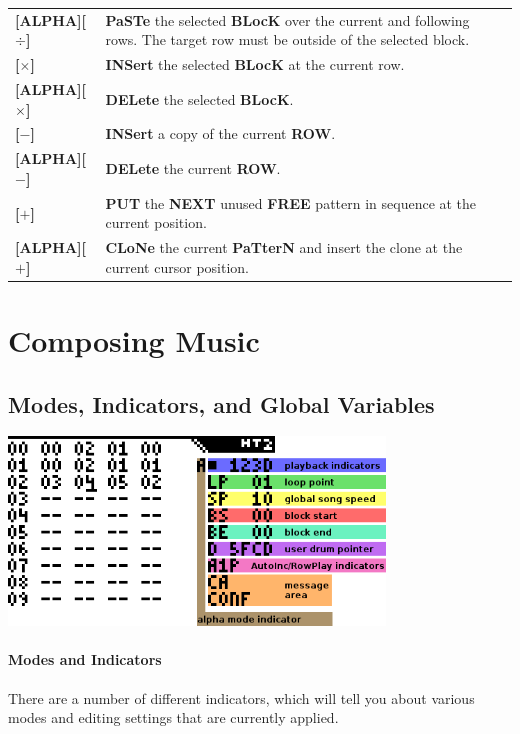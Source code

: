 \documentclass[12pt]{report}	%
\begin{document}
\begin{longtable}{p{} p{} }
\hline
\textbf{[ALPHA][\(\bm{\div}\)]} & \textbf{PaSTe} the selected \textbf{BLocK} over the current and following rows. The target row must be outside of the selected block. \\
\textbf{[\(\bm{\times}\)]} & \textbf{INSert} the selected \textbf{BLocK} at the current row. \\
\textbf{[ALPHA][\(\bm{\times}\)]} & \textbf{DELete} the selected \textbf{BLocK}. \\
\textbf{[\(\bm{-}\)]} & \textbf{INSert} a copy of the current \textbf{ROW}. \\
\textbf{[ALPHA][\(\bm{-}\)]} & \textbf{DELete} the current \textbf{ROW}. \\
\textbf{[\(\bm{+}\)]} & \textbf{PUT} the \textbf{NEXT} unused \textbf{FREE} pattern in sequence at the current position. \\
\textbf{[ALPHA][\(\bm{+}\)]} & \textbf{CLoNe} the current \textbf{PaTterN} and insert the clone at the current cursor position. \\
\hline
\end{longtable}


\section{Composing Music}
\subsection{Modes, Indicators, and Global Variables}

{\includegraphics[width=0.75\textwidth]{vars}} \newline

\paragraph{Modes and Indicators} There are a number of different indicators, which will tell you about various modes and editing settings that are currently applied.
\end{document}
